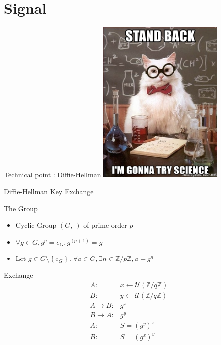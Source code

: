 \documentclass{beamer}
\newcommand{\ZZ}{\mathbb{Z}}
\newcommand{\Uu}{\mathcal{U}}
\newcommand{\la}{\leftarrow}
\newcommand{\ra}{\rightarrow}
\newcommand{\set}[1]{\left\{ #1 \right\}}
\begin{document}
\section{Signal}
\begin{frame}{Technical point : Diffie-Hellman}
	\center
	\includegraphics[height=8cm]{img/stand-back-im-gonna-try-science.jpg} 
\end{frame}

\begin{frame}{Diffie-Hellman Key Exchange}
	\begin{block}{The Group}
		\begin{itemize}
			\item Cyclic Group $(G, \cdot)$ of prime order $p$
			\item $\forall g \in G, g^p = e_G, g^{(p+1)} = g$
			\item Let $g \in G\setminus \set{e_G}$. $\forall a \in G, \exists n \in \ZZ / p\ZZ, a = g^n$
		\end{itemize}
	\end{block}

	\pause

	\begin{block}{Exchange}
	$$
    \begin{array}{rl}
      A :                           & x \la \Uu(\ZZ / q\ZZ) \\
      B :                           & y \la \Uu(\ZZ / q\ZZ) \\
      A \ra B :                     & g^x \\
      B \ra A :                     & g^y \\
      A :                           & S = (g^y)^x \\
      B :                           & S = (g^x)^y \\
    \end{array}
   $$
	\end{block}

\end{frame}
\end{document}
